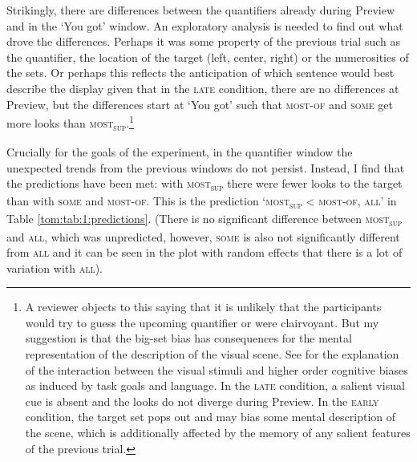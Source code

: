 \documentclass[output=paper]{langscibook}
\begin{document}
\begin{figure}[p]
\begin{tabularx}{\textwidth}{C@{}C@{}C@{}C}
 \end{tabularx}
\end{figure}

Strikingly, there are differences between the quantifiers already during Preview and in the `You got' window. An
exploratory analysis is needed to find out what drove the differences. Perhaps it was some property of the previous
trial such as the quantifier, the location of the target (left, center, right) or the numerosities of the sets. Or perhaps
this reflects the anticipation of which sentence would best describe the display given that in the \textsc{late} condition,
there are no differences at Preview, but the differences start at `You got' such that \textsc{most-of} and
\textsc{some} get more looks than \textsc{most\textsubscript{sup}}.\footnote{ A reviewer
objects to this saying that it is unlikely that the participants would try to guess the upcoming quantifier or were
clairvoyant. But my suggestion is that the big-set bias has consequences for the mental representation of the
description of the visual scene. See \citet{huettig2011looking} for the explanation of the interaction between the visual
stimuli and higher order cognitive biases as induced by task goals and language. In the \textsc{late} condition, a salient
visual cue is absent and the looks do not diverge during Preview. In the \textsc{early} condition, the target set pops out and
may bias some mental description of the scene, which is additionally affected by the memory of any salient features of
the previous trial.}

Crucially for the goals of the experiment, in the quantifier window the unexpected trends from the previous windows do
not persist. Instead, I find that the predictions have been met: with \textsc{most\textsubscript{sup}} there were
fewer looks to the target than with \textsc{some} and \textsc{most-of}. This is the prediction
`\textsc{most\textsubscript{sup}} {\textless} \textsc{most-of}, \textsc{all}' in Table \ref{tom:tab:1:predictions}. (There is no significant
difference between \textsc{most\textsubscript{sup}} and \textsc{all}, which was unpredicted, however, \textsc{some} is
also not significantly different from \textsc{all} and it can be seen in the plot with random effects that there is a
lot of variation with \textsc{all}). 
\end{document}
